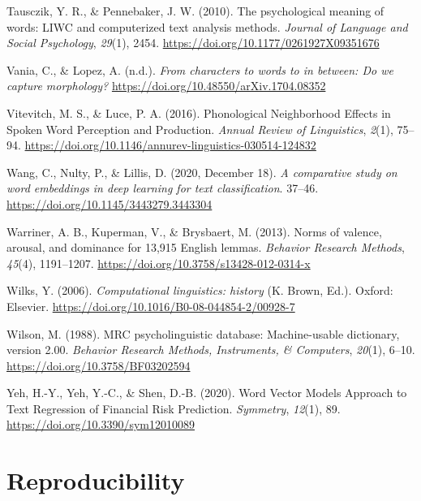 \documentclass[
  english,
  man,floatsintext]{apa6}
\newlength{\cslhangindent}
\newenvironment{CSLReferences}[2] %
 {\begin{list}{}{%
  \setlength{\itemindent}{0pt}
  \setlength{\leftmargin}{0pt}
  \setlength{\parsep}{0pt}
  \ifodd #1
   \setlength{\leftmargin}{\cslhangindent}
   \setlength{\itemindent}{-1\cslhangindent}
  \fi
  \setlength{\itemsep}{#2\baselineskip}}}
 {\end{list}}
\begin{document}
\begin{CSLReferences}{1}{0}
Tausczik, Y. R., \& Pennebaker, J. W. (2010). The psychological meaning of words: LIWC and computerized text analysis methods. \emph{Journal of Language and Social Psychology}, \emph{29}(1), 2454. \url{https://doi.org/10.1177/0261927X09351676}

Vania, C., \& Lopez, A. (n.d.). \emph{From characters to words to in between: Do we capture morphology?} \url{https://doi.org/10.48550/arXiv.1704.08352}

Vitevitch, M. S., \& Luce, P. A. (2016). Phonological Neighborhood Effects in Spoken Word Perception and Production. \emph{Annual Review of Linguistics}, \emph{2}(1), 75--94. \url{https://doi.org/10.1146/annurev-linguistics-030514-124832}

Wang, C., Nulty, P., \& Lillis, D. (2020, December 18). \emph{A comparative study on word embeddings in deep learning for text classification}. 37--46. \url{https://doi.org/10.1145/3443279.3443304}

Warriner, A. B., Kuperman, V., \& Brysbaert, M. (2013). Norms of valence, arousal, and dominance for 13,915 English lemmas. \emph{Behavior Research Methods}, \emph{45}(4), 1191--1207. \url{https://doi.org/10.3758/s13428-012-0314-x}

Wilks, Y. (2006). \emph{Computational linguistics: history} (K. Brown, Ed.). Oxford: Elsevier. \url{https://doi.org/10.1016/B0-08-044854-2/00928-7}

Wilson, M. (1988). MRC psycholinguistic database: Machine-usable dictionary, version 2.00. \emph{Behavior Research Methods, Instruments, \& Computers}, \emph{20}(1), 6--10. \url{https://doi.org/10.3758/BF03202594}

Yeh, H.-Y., Yeh, Y.-C., \& Shen, D.-B. (2020). Word Vector Models Approach to Text Regression of Financial Risk Prediction. \emph{Symmetry}, \emph{12}(1), 89. \url{https://doi.org/10.3390/sym12010089}

\end{CSLReferences}

\appendix


\section{Reproducibility}\label{reproducibility}
\end{document}
